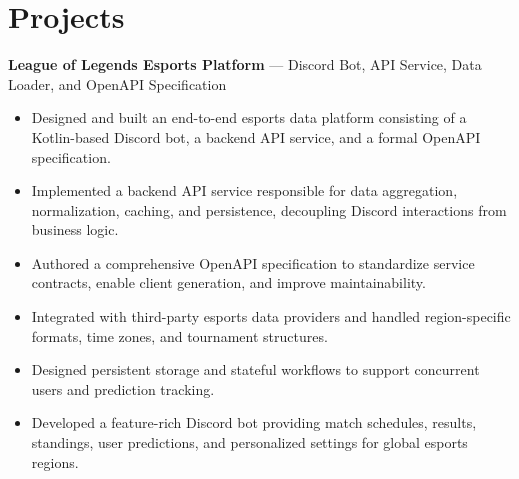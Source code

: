 \documentclass[11pt]{article}
\begin{document}
    \section*{Projects}

    \noindent\textbf{League of Legends Esports Platform} --- Discord Bot, API Service, Data Loader, and OpenAPI Specification
    \begin{itemize}
        \item Designed and built an end-to-end esports data platform consisting of a Kotlin-based Discord bot, a backend API service, and a formal OpenAPI specification.
        \item Implemented a backend API service responsible for data aggregation, normalization, caching, and persistence, decoupling Discord interactions from business logic.
        \item Authored a comprehensive OpenAPI specification to standardize service contracts, enable client generation, and improve maintainability.
        \item Integrated with third-party esports data providers and handled region-specific formats, time zones, and tournament structures.
        \item Designed persistent storage and stateful workflows to support concurrent users and prediction tracking.
        \item Developed a feature-rich Discord bot providing match schedules, results, standings, user predictions, and personalized settings for global esports regions.
    \end{itemize}

    \vspace{4mm}
\end{document}
